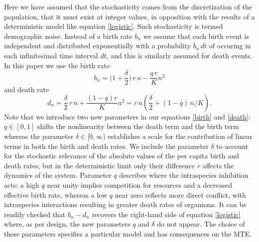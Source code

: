 Here we have assumed that the stochasticity comes from the discretization of the population, that it must exist at integer values, in opposition with the results of a deterministic model like equation \ref{logistic}.
Such stochasticity is termed demographic noise.
Instead of a birth rate $b_n$ we assume that each birth event is independent and distributed exponentially with a probability $b_n\,dt$ of occuring in each infinitesimal time interval $dt$, and this is similarly assumed for death events. %
In this paper we use the birth rate
\begin{equation}
 b_n = \Big(1 + \frac{\delta}{2}\Big)\,r\,n - \frac{q\,r}{K}n^2%
\label{birth}
\end{equation}
and death rate
\begin{equation}
 d_n = \frac{\delta}{2}\,r\,n + \frac{(1-q)r}{K} n^2 = r\,n\left(\frac{\delta}{2}+(1-q)\,n/K\right).
\label{death}
\end{equation}
Note that we introduce two new parameters in our equations \ref{birth} and \ref{death}: $q\in[0,1]$ shifts the nonlinearity between the death term and the birth term whereas the parameter $\delta\in[0,\infty)$ establishes a scale for the contribution of linear terms in both the birth and death rates.
We include the parameter $\delta$ to account for the stochastic relevance of the absolute values of the per capita birth and death rates, but in the deterministic limit only their difference $r$ affects the dynamics of the system.
Parameter $q$ describes where the intraspecies inhibition acts: a high $q$ near unity implies competition for resources and a decreased effective birth rate, whereas a low $q$ near zero reflects more direct conflict, with intraspecies interactions resulting in greater death rates of organisms.
It can be readily checked that $b_n-d_n$ recovers the right-hand side of equation \ref{logistic} where, as per design, the new parameters $q$ and $\delta$ do not appear.
The choice of these parameters specifies a particular model and has consequences on the MTE.


